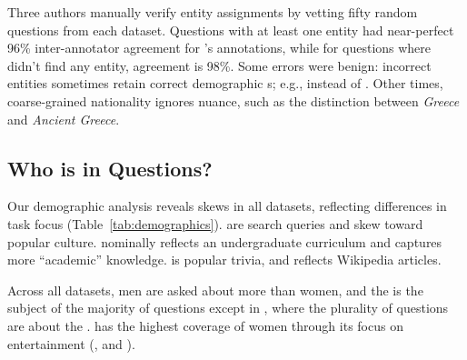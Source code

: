\label{entity-linking-procedure}



\label{entity-linking-validation}

Three authors manually verify entity assignments by vetting fifty random questions from each dataset. Questions with at least one entity had near-perfect 96\% inter-annotator agreement for 's annotations, while for questions where  didn't find any entity, agreement is 98\%. Some errors were benign: incorrect entities sometimes retain correct demographic \demorow{}s; e.g.,  instead of . Other times, coarse-grained nationality ignores nuance, such as the distinction between \emph{Greece} and \emph{Ancient Greece}.

\subsection{Who is in Questions?}
\label{sec:distribution}

Our demographic analysis reveals skews in all datasets, reflecting differences in task focus (Table~\ref{tab:demographics}).
\nq{} are search queries and skew toward popular culture.
\qb{} nominally reflects an undergraduate curriculum and captures more ``academic'' knowledge.
\triviaqa{} is popular trivia, and \squad{} reflects Wikipedia articles.

Across all datasets, men are asked about more than women, and the  is the subject of the majority of questions except in \triviaqa{}, where the plurality of questions are about the .
\nq{} has the highest coverage of women through its focus on entertainment (\film{}, \music{} and \sports{}).
